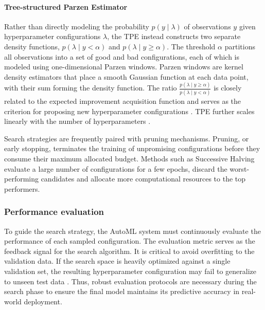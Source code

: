 

\paragraph{Tree-structured Parzen Estimator} 

Rather than directly modeling the probability $p(y \mid \lambda)$ of observations $y$ given hyperparameter configurations $\lambda$, the \ac{TPE} \parencite{bergstra2011algorithms} instead constructs two separate density functions, $p(\lambda \mid y < \alpha)$ and $p(\lambda \mid y \geq \alpha)$. The threshold $\alpha$ partitions all observations into a set of good and bad configurations, each of which is modeled using one-dimensional Parzen windows. 
Parzen windows are kernel density estimators that place a smooth Gaussian function at each data point, with their sum forming the density function.
 The ratio $\frac{p(\lambda\mid y \ge \alpha)}{p(\lambda\mid y < \alpha)}$ is closely related to the expected improvement acquisition function and serves as the criterion for proposing new hyperparameter configurations \parencite{bergstra2011algorithms, hutter2019automated}. \ac{TPE} further scales linearly with the number of hyperparameters \parencite{AutoMLHoos}. %


Search strategies are frequently paired with pruning mechanisms. Pruning, or early stopping, terminates the training of unpromising configurations before they consume their maximum allocated budget. Methods such as Successive Halving evaluate a large number of configurations for a few epochs, discard the worst-performing candidates and allocate more computational resources to the top performers.


\subsubsection{Performance evaluation}
To guide the search strategy, the \ac{AutoML} system must continuously evaluate the performance of each sampled configuration. The evaluation metric serves as the feedback signal for the search algorithm. It is critical to avoid overfitting to the validation data. If the search space is heavily optimized against a single validation set, the resulting hyperparameter configuration may fail to generalize to unseen test data \parencite{hutter2019automated}. Thus, robust evaluation protocols are necessary during the search phase to ensure the final model maintains its predictive accuracy in real-world deployment.